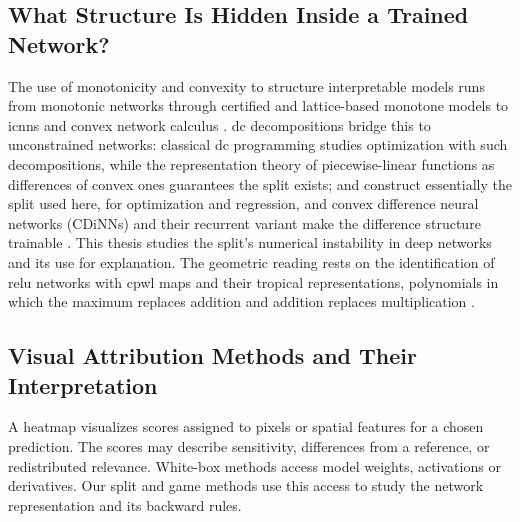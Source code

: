 \subsection{What Structure Is Hidden Inside a Trained Network?}
The use of monotonicity and convexity to structure interpretable models runs from monotonic networks \parencite{Sill1997_MonotonicNetworks,Daniels2010_MonotoneNN} through certified and lattice-based monotone models \parencite{Liu2020CertifiedMonotone,Gupta2016MonotoneLattice,Sivaraman2020_COMET,Nguyen2023_MonoNet,Runje_2023} to \acp{icnn} \parencite{Amos2017} and convex network calculus \parencite{Bach2017ConvexNN,Calafiore2019DLSE,sivaprasad2021curious}. \ac{dc} decompositions bridge this to unconstrained networks: classical \ac{dc} programming \parencite{Tao1997_DCProgramming,LeThi2018DCA,Sriperumbudur2009CCCP} studies optimization with such decompositions, while the representation theory of piecewise-linear functions as differences of convex ones \parencite{Melzer1986_PLasDC,Kripfganz1987_PWAasDC,Zalgaller2000_DCRepresentation,Griewank2020_PolyhedralDCDecomposition,Schlueter2021_ConvexDecompPAF,Koutschan2024_MinimalArity,Kazda2024_LP_DCPLA,Brandenburg2025_DecompositionPolyhedra} guarantees the split exists; \textcite{Awasthi2023DCNN} and \textcite{Siahkamari2020_DCRegression} construct essentially the split used here, for optimization and regression, and convex difference neural networks (CDiNNs) and their recurrent variant make the difference structure trainable \parencite{Sankaranarayanan2021CDINN,Chen2025_RCDiNN}. This thesis studies the split's numerical instability in deep networks and its use for explanation. The geometric reading rests on the identification of \ac{relu} networks with \ac{cpwl} maps \parencite{Arora2018,BalestrieroBaraniuk2018MadMax,huchette2025deeplearningmeetspolyhedral} and their tropical representations, polynomials in which the maximum replaces addition and addition replaces multiplication \parencite{Zhang2018}.

\subsection{Visual Attribution Methods and Their Interpretation}\label{subsec:visual_attribution_related}
A heatmap visualizes scores assigned to pixels or spatial features for a chosen prediction. The scores may describe sensitivity, differences from a reference, or redistributed relevance. White-box methods access model weights, activations or derivatives. Our split and game methods use this access to study the network representation and its backward rules.

